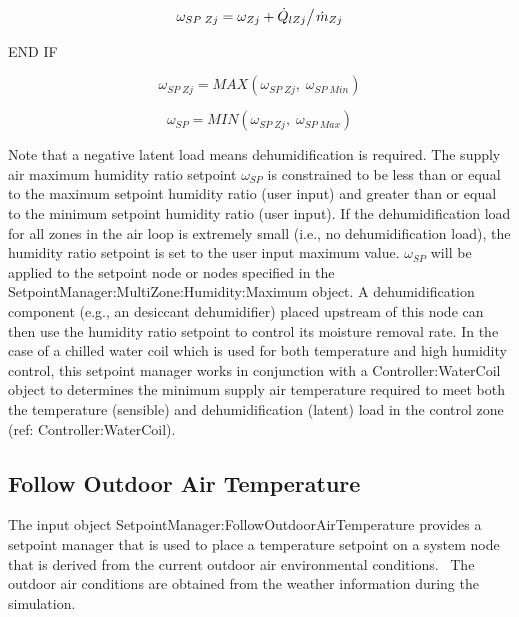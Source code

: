 \begin{equation}
{\omega_{SP\;Zj}} = {\omega_{Zj}} + {{{{\dot Q}_{lZj}}} \mathord{\left/ {\vphantom {{{{\dot Q}_{lZj}}} {{{\dot m}_{Zj}}}}} \right. } {{{\dot m}_{Zj}}}}
\end{equation}

END IF

\begin{equation}
{\omega_{SP\;Zj}} = MAX\left( {{\omega_{SP\;Zj}},\;{\omega_{SP\;Min}}} \right)
\end{equation}

\begin{equation}
{\omega_{SP}} = MIN\left( {{\omega_{SP\;Zj}},\;{\omega_{SP\;Max}}} \right)
\end{equation}

Note that a negative latent load means dehumidification is required. The supply air maximum humidity ratio setpoint \({\omega_{SP}}\) is constrained to be less than or equal to the maximum setpoint humidity ratio (user input) and greater than or equal to the minimum setpoint humidity ratio (user input). If the dehumidification load for all zones in the air loop is extremely small (i.e., no dehumidification load), the humidity ratio setpoint is set to the user input maximum value. \({\omega_{SP}}\) will be applied to the setpoint node or nodes specified in the SetpointManager:MultiZone:Humidity:Maximum object. A dehumidification component (e.g., an desiccant dehumidifier) placed upstream of this node can then use the humidity ratio setpoint to control its moisture removal rate. In the case of a chilled water coil which is used for both temperature and high humidity control, this setpoint manager works in conjunction with a Controller:WaterCoil object to determines the minimum supply air temperature required to meet both the temperature (sensible) and dehumidification (latent) load in the control zone (ref: Controller:WaterCoil).

\subsection{Follow Outdoor Air Temperature}\label{follow-outdoor-air-temperature}

The input object SetpointManager:FollowOutdoorAirTemperature provides a setpoint manager that is used to place a temperature setpoint on a system node that is derived from the current outdoor air environmental conditions.~ The outdoor air conditions are obtained from the weather information during the simulation.

